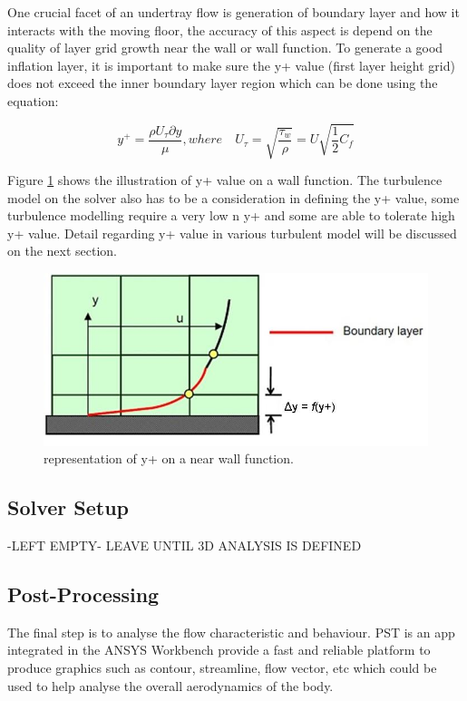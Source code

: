 \noindent One crucial facet of an undertray flow is generation of boundary layer and how it interacts with the moving floor, the accuracy of this aspect is depend on the quality of layer grid growth near the wall or wall function. To generate a good inflation layer, it is important to make sure the y+ value (first layer height grid) does not exceed the inner boundary layer region which can be done using the equation:

\begin{equation}
    y^+ = \frac{\rho U_\tau \partial y}{\mu}, where \quad U_\tau = \sqrt{\frac{\tau_w}{\rho}} = U \sqrt{\frac{1}{2}C_f}
\end{equation}

\noindent Figure \ref{fig:inflation layer} shows the illustration of y+ value on a wall function. The turbulence model on the solver also has to be a consideration in defining the y+ value, some turbulence modelling require a very low n y+ and some are able to tolerate high y+ value. Detail regarding y+ value in various turbulent model will be discussed on the next section. 

\begin{figure}[!ht]
    \centering
    \includegraphics{Figures/inflation_layer.jpg}
    \caption{representation of y+ on a near wall function\cite{Inflate4Zealand}.}
    \label{fig:inflation layer}
\end{figure}



\subsection{Solver Setup}
-LEFT EMPTY-
LEAVE UNTIL 3D ANALYSIS IS DEFINED

\subsection{Post-Processing}
The final step is to analyse the flow characteristic and behaviour. PST is an app integrated in the ANSYS Workbench provide a fast and reliable platform to produce graphics such as contour, streamline, flow vector, etc which could be used to help analyse the overall aerodynamics of the body. 

